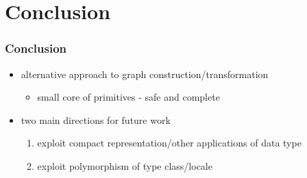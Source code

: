 \documentclass{beamer}
\begin{document}
\section{Conclusion}
\begin{frame}
  \frametitle{Conclusion}
  \begin{alertblock}{}
  \begin{itemize}
  \item<+-> alternative approach to graph construction/transformation
    \begin{itemize}
    \item small core of primitives - safe and complete
    \end{itemize}
  \item<+-> two main directions for future work
    \begin{enumerate}
    \item exploit compact representation/other applications of data type
    \item exploit polymorphism of type class/locale
    \end{enumerate}
  \end{itemize}
  \end{alertblock}
\end{frame}
\end{document}

